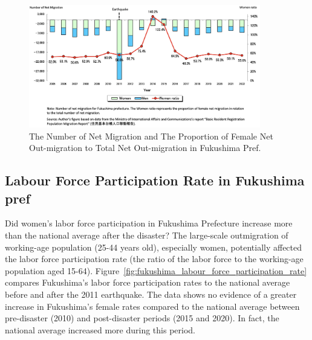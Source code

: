 \documentclass[a4paper,12pt]{article}
\begin{document}
\begin{figure}[h!]
    \centering
    \includegraphics[width=0.9\textwidth]{Number of net migration.jpeg}  %
    \caption{The Number of Net Migration and The Proportion of Female Net Out-migration to Total Net Out-migration in Fukushima Pref.}
    \label{fig:number_of_net_migration}
\end{figure}

\newpage

\subsection{Labour Force Participation Rate in Fukushima pref}
\label{sec4.1}


Did women's labor force participation in Fukushima Prefecture increase more than the national average after the disaster?
The large-scale outmigration of working-age population (25-44 years old), especially women, potentially affected the labor force participation rate (the ratio of the labor force to the working-age population aged 15-64). Figure~\ref{fig:fukushima_labour_force_participation_rate} compares Fukushima's labor force participation rates to the national average before and after the 2011 earthquake. The data shows no evidence of a greater increase in Fukushima's female rates compared to the national average between pre-disaster (2010) and post-disaster periods (2015 and 2020). In fact, the national average increased more during this period.


\end{document}
